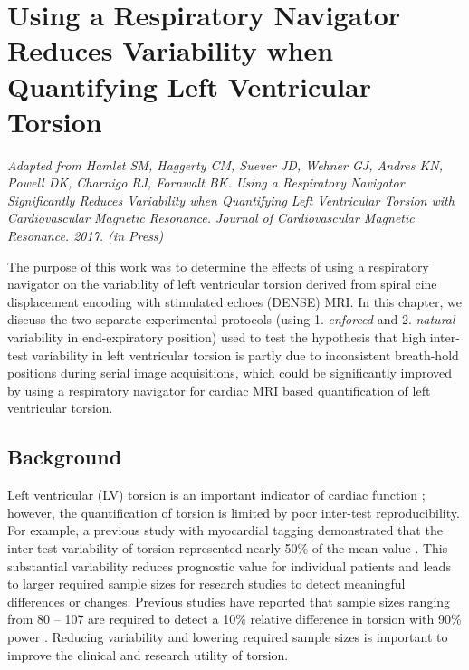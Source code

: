 \chapter{Using a Respiratory Navigator Reduces Variability when Quantifying Left Ventricular Torsion}

\begin{center}
\textit{Adapted from Hamlet SM, Haggerty CM, Suever JD, Wehner GJ, Andres KN, Powell DK, Charnigo RJ, Fornwalt BK. Using a Respiratory Navigator Significantly Reduces Variability when Quantifying Left Ventricular Torsion with Cardiovascular Magnetic Resonance. Journal of Cardiovascular Magnetic Resonance. 2017. (in Press)}
\end{center}

The purpose of this work was to determine the effects of using a respiratory navigator on the variability of left ventricular torsion derived from spiral cine displacement encoding with stimulated echoes (DENSE) MRI. In this chapter, we discuss the two separate experimental protocols (using 1. \textit{enforced} and 2. \textit{natural} variability in end-expiratory position) used to test the hypothesis that high inter-test variability in left ventricular torsion is partly due to inconsistent breath-hold positions during serial image acquisitions, which could be significantly improved by using a respiratory navigator for cardiac MRI based quantification of left ventricular torsion.

\section{Background}
	Left ventricular (LV) torsion is an important indicator of cardiac function \cite{Russel2011b,Gotte2006a}; however, the quantification of torsion is limited by poor inter-test reproducibility. For example, a previous study with myocardial tagging demonstrated that the inter-test variability of torsion represented nearly 50\% of the mean value \cite{Donekal2013a}. This substantial variability reduces prognostic value for individual patients and leads to larger required sample sizes for research studies to detect meaningful differences or changes. Previous studies have reported that sample sizes ranging from 80 – 107 are required to detect a 10\% relative difference in torsion with 90\% power \cite{Donekal2013a,Kowallick2016,Kaku2014a}. Reducing variability and lowering required sample sizes is important to improve the clinical and research utility of torsion.
	

